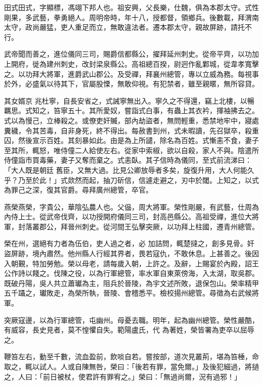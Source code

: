 \begin{pinyinscope}
 田式田式，字顯標，馮翊下邦人也。祖安興，父長樂，仕魏，俱為本郡太守。式性剛果，多武藝，拳勇絕人。周明帝時，年十八，授都督，領鄉兵。後數載，拜渭南太守，政尚嚴猛，吏人重足而立，無敢違法者。遷本郡太守，親故屏跡，請托不行。



 武帝聞而善之，進位儀同三司，賜爵信都縣公，擢拜延州刺史。從帝平齊，以功加上開府，徙為建州刺史，改封梁泉縣公。高祖總百揆，尉迥作亂鄴城，從韋孝寬擊之。以功拜大將軍，進爵武山郡公。及受禪，拜襄州總管，專以立威為務。每視事於外，必盛氣以待其下，官屬股慄，無敢仰視。有犯禁者，雖至親暱，無所容貸。



 其女婿京
 兆杜寧，自長安省之，式誡寧無出入。寧久之不得還，竊上北樓，以暢羈思。式知之，笞寧五十。其所愛奴，嘗詣式白事，有蟲上其衣衿，揮袖拂去之。式以為慢己，立棒殺之。或僚吏奸贓，部內劫盜者，無問輕重，悉禁地牢中，寢處糞穢，令其苦毒，自非身死，終不得出。每赦書到州，式未暇讀，先召獄卒，殺重囚，然後宣示百姓。其刻暴如此。由是為上所譴，除名為百姓。式慚恚不食，妻子至其所，輒怒，唯侍僮二人給使左右。從家中索椒，欲以自殺，家人不與。陰遣所侍僮詣市買毒藥，妻子又奪而棄之。式恚臥。其子信時為儀同，至式前流涕曰：「大人既是朝廷
 舊臣，又無大過。比見公卿放辱者多矣，旋復升用，大人何能久乎？乃至於此！」式欻然而起，抽刀斫信，信遽走避之，刃中於閾。上知之，以式為罪己之深，復其官爵。尋拜廣州總管，卒官。



 燕榮燕榮，字貴公，華陰弘農人也。父偘，周大將軍。榮性剛嚴，有武藝，仕周為內侍上士。從武帝伐齊，以功授開府儀同三司，封高邑縣公。高祖受禪，進位大將軍，封落叢郡公，拜晉州刺史。從河間王弘擊突厥，以功拜上柱國，遷青州總管。



 榮在州，選絕有力者為伍伯，吏人過之者，必
 加詰問，輒楚撻之，創多見骨。奸盜屏跡，境內肅然。他州縣人行經其界者，畏若寇仇，不敢休息。上甚善之。後因入朝覲，特加勞勉。榮以母老，請每歲入朝，上許之。及辭，上賜宴於內殿，詔王公作詩以餞之。伐陳之役，以為行軍總管，率水軍自東萊傍海，入太湖，取吳郡。既破丹陽，吳人共立蕭瓛為主，阻兵於晉陵，為宇文述所敗，退保包山。榮率精甲五千躡之，瓛敗走，為榮所執，晉陵、會稽悉平。檢校揚州總管。尋徵為右武候將軍。



 突厥寇邊，以為行軍總管，屯幽州。母憂去職。明年，起為幽州總管。榮性嚴酷，有威容，長史見者，莫不惶懼自失。範陽盧氏，代
 為著姓，榮皆署為吏卒以屈辱之。



 鞭笞左右，動至千數，流血盈前，飲啖自若。嘗按部，道次見叢荊，堪為笞棰，命取之，輒以試人。人或自陳無咎，榮曰：「後若有罪，當免爾。」及後犯細過，將撾之，人曰：「前日被杖，使君許有罪宥之。」榮曰：「無過尚爾，況有過邪！」




\end{pinyinscope}
